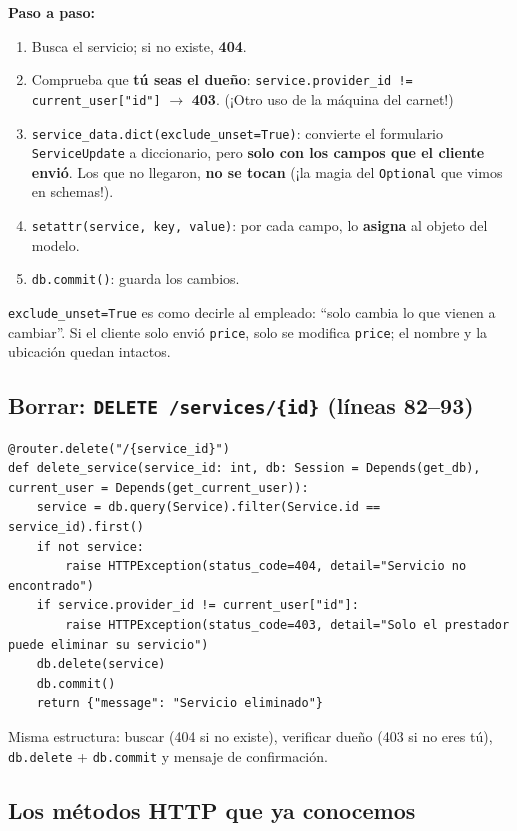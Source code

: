 \documentclass[11pt,a4paper]{article}
\begin{document}
\textbf{Paso a paso:}
\begin{enumerate}
    \item Busca el servicio; si no existe, \textbf{404}.
    \item Comprueba que \textbf{tú seas el dueño}: \texttt{service.provider\_id != current\_user["id"]}
    $\rightarrow$ \textbf{403}. (¡Otro uso de la máquina del carnet!)
    \item \texttt{service\_data.dict(exclude\_unset=True)}: convierte el formulario \texttt{ServiceUpdate}
    a diccionario, pero \textbf{solo con los campos que el cliente envió}. Los que no llegaron,
    \textbf{no se tocan} (¡la magia del \texttt{Optional} que vimos en schemas!).
    \item \texttt{setattr(service, key, value)}: por cada campo, lo \textbf{asigna} al objeto del modelo.
    \item \texttt{db.commit()}: guarda los cambios.
\end{enumerate}

\begin{analogia}
\texttt{exclude\_unset=True} es como decirle al empleado: ``solo cambia lo que vienen a
cambiar''. Si el cliente solo envió \texttt{price}, solo se modifica \texttt{price};
el nombre y la ubicación quedan intactos.
\end{analogia}

\subsection{Borrar: \texttt{DELETE /services/\{id\}} (líneas 82--93)}

\begin{lstlisting}
@router.delete("/{service_id}")
def delete_service(service_id: int, db: Session = Depends(get_db), current_user = Depends(get_current_user)):
    service = db.query(Service).filter(Service.id == service_id).first()
    if not service:
        raise HTTPException(status_code=404, detail="Servicio no encontrado")
    if service.provider_id != current_user["id"]:
        raise HTTPException(status_code=403, detail="Solo el prestador puede eliminar su servicio")
    db.delete(service)
    db.commit()
    return {"message": "Servicio eliminado"}
\end{lstlisting}

Misma estructura: buscar (404 si no existe), verificar dueño (403 si no eres tú),
\texttt{db.delete} + \texttt{db.commit} y mensaje de confirmación.

\subsection{Los métodos HTTP que ya conocemos}
\end{document}
